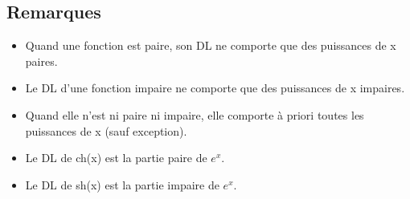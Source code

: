 \documentclass[french]{yLectureNote}
\begin{document}
\subsection{Remarques}
\begin{itemize}
 \item Quand une fonction est paire, son DL ne comporte que des puissances de x paires.
\item Le DL d’une fonction impaire ne comporte que des puissances de x impaires.
\item Quand elle n’est ni paire ni impaire, elle comporte à priori toutes les puissances de x (sauf exception).
\item Le DL de ch(x) est la partie paire de $e^x$.
\item Le DL de sh(x) est la partie impaire de $e^x$.
\end{itemize}
\end{document}
